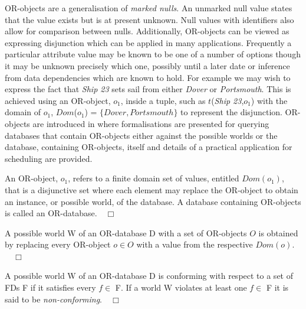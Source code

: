 OR-objects \cite{inv91} are a generalisation of {\em marked nulls}. An
unmarked null 
value states that the value exists but is at present
unknown. Null values with identifiers also allow for comparison between nulls.
Additionally, OR-objects can be viewed as expressing disjunction which
can be applied in many applications.  Frequently a particular
attribute value may be known to be one of a number of options though
it may be unknown precisely which one, possibly until a later date or
inference from data dependencies which are known to hold.  For example
we may wish to express the
fact that {\em Ship 23} sets sail from either {\em Dover} or {\em
Portsmouth}.  This is achieved using an OR-object, $o_1$, inside a
tuple, such as $t$({\em Ship 23},$o_1$) with the domain of $o_1$,
$Dom$($o_1$) = $\{Dover, Portsmouth\}$ to represent the disjunction.
OR-objects are introduced in \cite{inv91} where formalisations are
presented for querying databases that contain OR-objects either
against the possible worlds or the database, containing OR-objects,
itself and details of a practical application for scheduling are provided. 

\begin{definition}[OR-Object]
\begin{rm}
An OR-object, $o_1$, refers to a finite domain set of values, entitled
$Dom(o_1)$, that is a disjunctive set where each element may replace
the OR-object to obtain an instance, or possible world, of the
database. A database containing OR-objects is called an
OR-database.$\quad\Box$ 
\end{rm}
\end{definition}


\begin{definition}
\begin{rm}
A possible world W of an OR-database  D with a set of OR-objects $O$
is obtained by replacing every OR-object $o \in O$ with a value from the
respective $Dom(o)$.$\quad\Box$
\end{rm}
\end{definition}

\begin{definition}
\begin{rm}
A possible world W of an OR-database D is conforming with respect to a set of
FDs F if it satisfies every $f \in$ F.  If a world W violates
at least one $f \in$ F it is said to be {\em non-conforming}.$\quad\Box$
\end{rm}
\end{definition}

